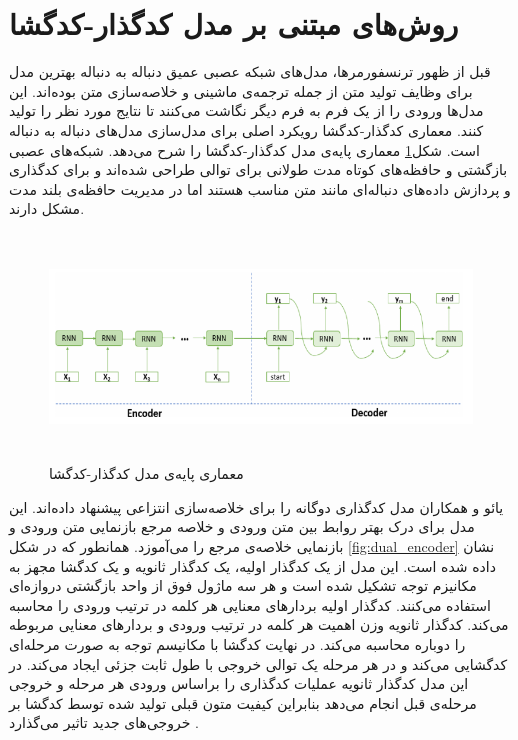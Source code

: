 % 


\section{روش‌های مبتنی بر مدل کدگذار-کدگشا}
قبل از ظهور ترنسفورمرها، مدل‌های شبکه عصبی عمیق دنباله به دنباله 
بهترین مدل برای وظایف تولید متن از جمله ترجمه‌ی ماشینی و خلاصه‌سازی متن بوده‌اند. این مدل‌ها ورودی را از یک فرم به فرم دیگر نگاشت می‌کنند تا نتایج مورد نظر را تولید کنند. معماری کدگذار-کدگشا رویکرد اصلی برای مدل‌سازی مدل‌های دنباله به دنباله است. شکل\ref{fig:encoder_decoder} معماری پایه‌‌ی مدل کدگذار-کدگشا را شرح می‌دهد.
شبکه‌های عصبی بازگشتی
 \cite{elman1990finding}
و حافظه‌های کوتاه مدت طولانی
 \cite{hochreiter1997long}
برای توالی طراحی شده‌اند و برای کدگذاری و پردازش داده‌های دنباله‌ای مانند متن مناسب هستند اما در مدیریت حافظه‌ی بلند مدت
مشکل دارند.
\begin{figure}[!h]
	\begin{center}
		\includegraphics[height=6cm]{encoder_decoder.png}
	\end{center}
	\caption{معماری پایه‌‌ی مدل کدگذار-کدگشا \cite{RL_survey}}
	\label{fig:encoder_decoder}
	\medskip
	\small
\end{figure}

یائو
و همکاران مدل کدگذاری دوگانه را برای خلاصه‌سازی انتزاعی پیشنهاد داده‌اند. این مدل برای درک بهتر روابط بین متن ورودی و خلاصه مرجع بازنمایی متن ورودی و بازنمایی خلاصه‌ی مرجع را می‌آموزد. همانطور که در شکل \ref{fig:dual_encoder} نشان داده شده است.
این مدل از یک کدگذار اولیه، یک کدگذار ثانویه و یک کدگشا مجهز به مکانیزم توجه تشکیل شده است و هر سه ماژول فوق از واحد بازگشتی دروازه‌ای
استفاده می‌کنند. 
کدگذار اولیه بردارهای معنایی هر کلمه در ترتیب ورودی را محاسبه می‌کند. کدگذار ثانویه وزن اهمیت هر کلمه در ترتیب ورودی و بردارهای معنایی مربوطه را دوباره محاسبه می‌کند. در نهایت کدگشا با مکانیسم توجه به صورت مرحله‌ای کدگشایی می‌کند و در هر مرحله یک توالی خروجی با طول ثابت جزئی ایجاد می‌کند. در این مدل کدگذار ثانویه عملیات کدگذاری را براساس ورودی هر مرحله و خروجی مرحله‌ی قبل انجام می‌دهد بنابراین کیفیت متون قبلی تولید شده توسط کدگشا بر خروجی‌های جدید تاثیر می‌گذارد
 \cite{yao2018dual}.



